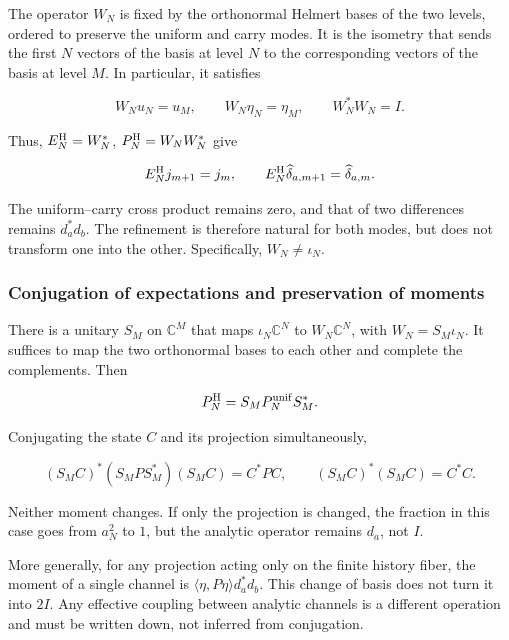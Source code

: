 The operator \(W_N\) is fixed by the orthonormal Helmert bases
of the two levels, ordered to preserve the uniform and
carry modes. It is the isometry that sends the first \(N\) vectors of the
basis at level \(N\) to the corresponding vectors of the basis at level \(M\).
In particular, it satisfies

\begin{equation}
W_Nu_N=u_M,\qquad W_N\eta_N=\eta_M,\qquad W_N^*W_N=I.
\label{gamma-add-display-12}
\end{equation}

Thus, \(E_N^{\rm H}=W_N^*\), \(P_N^{\rm H}=W_NW_N^*\) give

\begin{equation}
E_N^{\rm H}j_{m+1}=j_m,\qquad
E_N^{\rm H}\widehat\delta_{a,m+1}=\widehat\delta_{a,m}.
\label{gamma-add-eq-5}
\end{equation}

The uniform--carry cross product remains zero, and that of two differences remains \(d_a^*d_b\). The refinement is therefore natural for both modes, but does not transform one into the other. Specifically, \(W_N\ne\iota_N\).

\subsubsection{Conjugation of expectations and preservation of moments}
\label{gamma-add-sub-174}

There is a unitary \(S_M\) on \(\mathbb C^M\) that maps \(\iota_N\mathbb C^N\) to \(W_N\mathbb C^N\), with \(W_N=S_M\iota_N\). It suffices to map the two orthonormal bases to each other and complete the complements. Then

\begin{equation}
P_N^{\rm H}=S_MP_N^{\rm unif}S_M^*.
\label{gamma-add-display-14}
\end{equation}

Conjugating the state \(C\) and its projection simultaneously,

\begin{equation}
(S_MC)^*(S_MP S_M^*)(S_MC)=C^*PC,\qquad
(S_MC)^*(S_MC)=C^*C.
\label{gamma-add-eq-6}
\end{equation}

Neither moment changes. If only the projection is changed, the fraction in this case goes from \(a_N^2\) to \(1\), but the analytic operator remains \(d_a\), not \(I\).

More generally, for any projection acting only on the finite history fiber, the moment of a single channel is
\(\langle\eta,P\eta\rangle d_a^*d_b\). This change of basis does not turn it into \(2I\). Any effective coupling between analytic channels is a different operation and must be written down, not inferred from conjugation.

